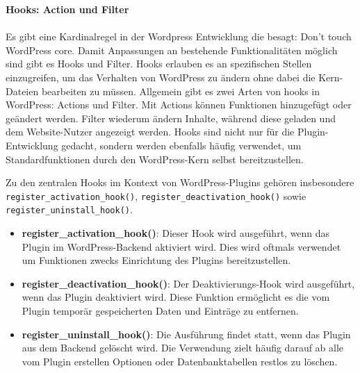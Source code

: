 \newpage
\textbf{Hooks: Action und Filter}\\\\
Es gibt eine Kardinalregel in der Wordpress Entwicklung die besagt: Don’t touch WordPress core. %
Damit Anpassungen an bestehende Funktionalitäten möglich sind gibt es Hooks und Filter.
Hooks erlauben es an spezifischen Stellen einzugreifen, um das Verhalten von WordPress zu ändern ohne dabei die Kern-Dateien bearbeiten zu müssen.
Allgemein gibt es zwei Arten von hooks in WordPress: Actions und Filter.
Mit Actions können Funktionen hinzugefügt oder geändert werden.
Filter wiederum ändern Inhalte, während diese geladen und dem Website-Nutzer angezeigt werden.
Hooks sind nicht nur für die Plugin-Entwicklung gedacht, sondern werden ebenfalls häufig verwendet, um Standardfunktionen durch den WordPress-Kern selbst bereitzustellen.

Zu den zentralen Hooks im Kontext von WordPress-Plugins gehören insbesondere \texttt{register\_activation\_hook()}, \texttt{register\_deactivation\_hook()} sowie \\ \texttt{register\_uninstall\_hook()}.

\begin{itemize}
 \item \textbf{register\_activation\_hook()}: Dieser Hook wird ausgeführt, wenn das Plugin im WordPress-Backend aktiviert wird. Dies wird oftmals verwendet um Funktionen zwecks Einrichtung des Plugins bereitzustellen.
 \item \textbf{register\_deactivation\_hook()}: Der Deaktivierungs-Hook wird ausgeführt, wenn das Plugin deaktiviert wird. Diese Funktion ermöglicht es die vom Plugin temporär gespeicherten Daten und Einträge zu entfernen.
 \item \textbf{register\_uninstall\_hook()}: Die Ausführung findet statt, wenn das Plugin aus dem Backend gelöscht wird. Die Verwendung zielt häufig darauf ab alle vom Plugin erstellen Optionen oder Datenbanktabellen restlos zu löschen.
\end{itemize}






